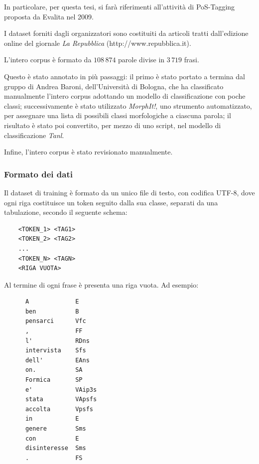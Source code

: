 In particolare, per questa tesi, si far\`a riferimenti all'attivit\`a di
PoS-Tagging proposta da Evalita nel 2009.

I dataset forniti dagli organizzatori sono costituiti da articoli tratti dall'edizione
online del giornale \emph{La Repubblica} (http://www.repubblica.it).

L'intero corpus \`e formato da $108\,874$ parole divise in $3\,719$ frasi.

Questo \`e stato annotato in pi\`u passaggi: il primo \`e stato portato a termina dal
gruppo di Andrea Baroni, dell'Universit\`a di Bologna, che ha classificato manualmente
l'intero corpus adottando un modello di classificazione con poche classi; successivamente
\`e stato utilizzato \emph{MorphIt!}, uno strumento automatizzato, per assegnare
una lista di possibili classi morfologiche a ciascuna parola; il risultato \`e
stato poi convertito, per mezzo di uno script, nel modello di classificazione \emph{Tanl}.

Infine, l'intero corpus \`e stato revisionato manualmente.

\subsubsection{Formato dei dati}
Il dataset di training \`e formato da un unico file di testo, con codifica UTF-8,
dove ogni riga costituisce un token seguito dalla sua classe, separati da una
tabulazione, secondo il seguente schema:

\begin{center}
  \begin{minipage}{5cm}
    \begin{verbatim}
    <TOKEN_1> <TAG1>
    <TOKEN_2> <TAG2>
    ...
    <TOKEN_N> <TAGN>
    <RIGA VUOTA>
    \end{verbatim}
  \end{minipage}
\end{center}

Al termine di ogni frase \`e presenta una riga vuota. Ad esempio:

\begin{center}
  \begin{minipage}{5cm}
    \begin{verbatim}
      A             E
      ben           B
      pensarci      Vfc
      ,             FF
      l'            RDns
      intervista    Sfs
      dell'         EAns
      on.           SA
      Formica       SP
      e'            VAip3s
      stata         VApsfs
      accolta       Vpsfs
      in            E
      genere        Sms
      con           E
      disinteresse  Sms
      .             FS

    \end{verbatim}
  \end{minipage}
\end{center}

